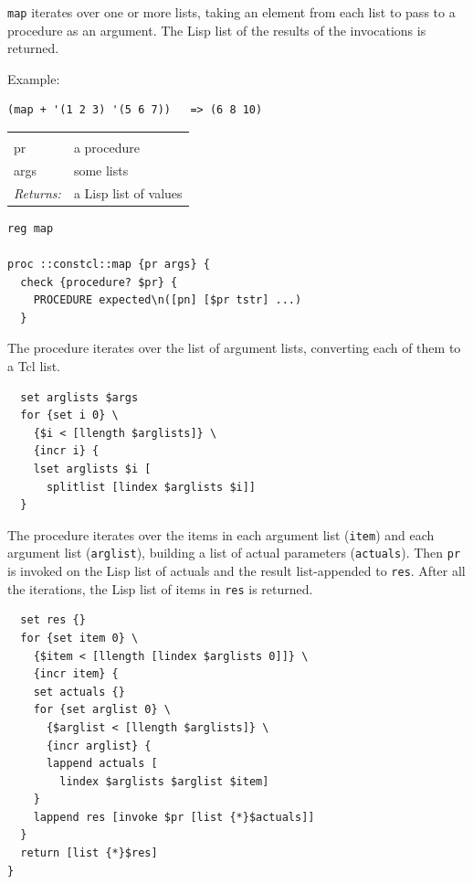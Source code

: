 \documentclass[a5paper,draft]{memoir}
\begin{document}
\texttt{map} iterates over one or more lists, taking an element from each list to pass to a procedure as an argument. The Lisp list of the results of the invocations is returned.

Example:

\begin{verbatim}
(map + '(1 2 3) '(5 6 7))   => (6 8 10)
\end{verbatim}

\noindent\begin{tabular}{ |p{1.9cm} p{6.5cm}| }
\hline
\rowcolor[HTML]{CCCCCC} \multicolumn{2}{|l|}{\textbf{map (public)}} \\
pr & a procedure \\
args & some lists \\
\textit{Returns:} & a Lisp list of values \\
\hline
\end{tabular}

\begin{lstlisting}
reg map

proc ::constcl::map {pr args} {
  check {procedure? $pr} {
    PROCEDURE expected\n([pn] [$pr tstr] ...)
  }
\end{lstlisting}

The procedure iterates over the list of argument lists, converting each of them to a Tcl list.

\begin{lstlisting}
  set arglists $args
  for {set i 0} \
    {$i < [llength $arglists]} \
    {incr i} {
    lset arglists $i [
      splitlist [lindex $arglists $i]]
  }
\end{lstlisting}

The procedure iterates over the items in each argument list (\texttt{item}) and each argument list (\texttt{arglist}), building a list of actual parameters (\texttt{actuals}). Then \texttt{pr} is invoked on the Lisp list of actuals and the result list-appended to \texttt{res}. After all the iterations, the Lisp list of items in \texttt{res} is returned.

\begin{lstlisting}
  set res {}
  for {set item 0} \
    {$item < [llength [lindex $arglists 0]]} \
    {incr item} {
    set actuals {}
    for {set arglist 0} \
      {$arglist < [llength $arglists]} \
      {incr arglist} {
      lappend actuals [
        lindex $arglists $arglist $item]
    }
    lappend res [invoke $pr [list {*}$actuals]]
  }
  return [list {*}$res]
}
\end{lstlisting}
\end{document}
